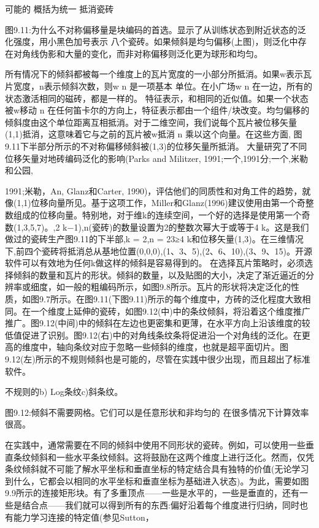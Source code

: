 {可能的
概括为统一
抵消瓷砖
 
 

图9.11:为什么不对称偏移量是块编码的首选。显示了从训练状态到附近状态的泛化强度，用小黑色加号表示
八个瓷砖。如果倾斜是均匀偏移(上图)，则泛化中存在对角线伪影和大量的变化，而非对称偏移则泛化更为球形和均匀。



所有情况下的倾斜都被每一个维度上的瓦片宽度的一小部分所抵消。如果w表示瓦片宽度，n表示倾斜次数，则w
n
是一项基本
单位。在小广场w
n
在一边，所有的状态激活相同的磁砖，都是一样的。
特征表示，和相同的近似值。如果一个状态被w移动
n
在任何笛卡尔的方向上，特征表示都由一个组件/块改变。均匀偏移的倾斜度由这个单位距离互相抵消。对于二维空间，我们说每个瓦片被位移矢量(1,1)抵消，这意味着它与之前的瓦片被w抵消
n
乘以这个向量。在这些方面,
图9.11下半部分所示的不对称偏移倾斜被(1,3)的位移矢量所抵消。
大量研究了不同位移矢量对地砖编码泛化的影响(Parks and Militzer, 1991;一个,1991分;一个,米勒和公园,

1991;米勒，An, Glanz和Carter, 1990)，评估他们的同质性和对角工件的趋势，就像(1,1)位移向量所见。基于这项工作，Miller和Glanz(1996)建议使用由第一个奇整数组成的位移向量。特别地，对于维k的连续空间，一个好的选择是使用第一个奇数(1,3,5,7)。,2 k−1),n(瓷砖)的数量设置为2的整数次幂大于或等于4 k。这是我们做过的瓷砖生产图9.11的下半部,k = 2,n = 23≥4 k和位移矢量(1,3)。在三维情况下,前四个瓷砖将抵消总从基地位置(0,0,0),(1、3、5),(2、6、10),(3、9、15)。开源软件可以有效地为任何k做这样的倾斜是容易得到的。
在选择瓦片策略时，必须选择倾斜的数量和瓦片的形状。倾斜的数量，以及贴图的大小，决定了渐近逼近的分辨率或细度，如一般的粗编码所示，如图9.8所示。瓦片的形状将决定泛化的性质，如图9.7所示。在图9.11(下图9.11)所示的每个维度中，方砖的泛化程度大致相同。在一个维度上延伸的瓷砖，如图9.12(中)中的条纹倾斜，将沿着这个维度推广推广。图9.12(中间)中的倾斜在左边也更密集和更薄，在水平方向上沿该维度的较低值促进了识别。图9.12(右)中的对角线条纹条将促进沿一个对角线的泛化。在更高的维度中，轴向条纹对应于忽略一些倾斜的维度，也就是超平面切片。图9.12(左)所示的不规则倾斜也是可能的，尽管在实践中很少出现，而且超出了标准软件。
 
不规则的b) Log条纹c)斜条纹。

图9.12:倾斜不需要网格。它们可以是任意形状和非均匀的
在很多情况下计算效率很高。


在实践中，通常需要在不同的倾斜中使用不同形状的瓷砖。例如，可以使用一些垂直条纹倾斜和一些水平条纹倾斜。这将鼓励在这两个维度上进行泛化。然而，仅凭条纹倾斜就不可能了解水平坐标和垂直坐标的特定结合具有独特的价值(无论学习到什么，它都会以相同的水平坐标和垂直坐标为基础进入状态)。为此，需要如图9.9所示的连接矩形块。有了多重顶点——一些是水平的，一些是垂直的，还有一些是结合点——我们就可以得到所有的东西:偏好沿着每个维度进行归纳，同时也有能力学习连接的特定值(参见Sutton，

}
